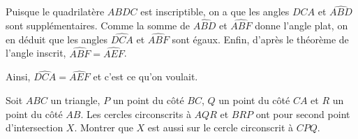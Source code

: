 \begin{sol}
Puisque le quadrilatère $ABDC$ est inscriptible, on a que les angles $\widehat{DCA}$ et $\widehat{ABD}$ sont supplémentaires. Comme la somme de $\widehat{ABD}$ et $\widehat{ABF}$ donne l'angle plat, on en déduit que les angles $\widehat{DCA}$ et $\widehat{ABF}$ sont égaux. Enfin, d'après le théorème de l'angle inscrit, $\widehat{ABF}=\widehat{AEF}$.

Ainsi, $\widehat{DCA}=\widehat{AEF}$ et c'est ce qu'on voulait.
\end{sol}


\begin{exo}
Soit $ABC$ un triangle, $P$ un point du côté $BC$, $Q$ un point
du côté $CA$ et $R$ un point du côté $AB$. Les cercles circonscrits
à $AQR$ et $BRP$ ont pour second point d'intersection $X$. Montrer
que $X$ est aussi sur le cercle circonscrit à $CPQ$.
\end{exo}

